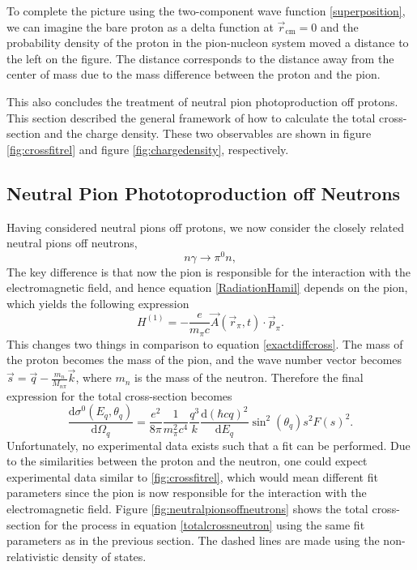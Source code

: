 To complete the picture using the two-component wave function \eqref{superposition}, we can imagine the bare proton as a delta function at $\vec{r}_\text{cm}=0$ and the probability density of the proton in the pion-nucleon system moved a distance to the left on the figure. The distance corresponds to the distance away from the center of mass due to the mass difference between the proton and the pion. 

This also concludes the treatment of neutral pion photoproduction off protons. This section described the general framework of how to calculate the total cross-section and the charge density. These two observables are shown in figure \ref{fig:crossfitrel} and figure \ref{fig:chargedensity}, respectively.


\subsection{Neutral Pion Phototoproduction off Neutrons}\label{sec:NoffN}
Having considered neutral pions off protons, we now consider the closely related neutral pions off neutrons,
\begin{equation} \label{process2}
	n\gamma \rightarrow \pi^0 n,
\end{equation}
The key difference is that now the pion is responsible for the interaction with the electromagnetic field, and hence equation \eqref{RadiationHamil} depends on the pion, which yields the following expression
\begin{equation} \label{RadiNeutron}
	H^{(1)} = -\frac{e}{m_\pi c}\vec{A}(\vec{r}_\pi,t)\cdot\vec{p}_\pi.
\end{equation}
This changes two things in comparison to equation \eqref{exactdiffcross}. The mass of the proton becomes the mass of the pion, and the wave number vector becomes $\vec{s}=\vec{q}-\frac{m_n}{M_{n\pi}}\vec{k}$, where $m_n$ is the mass of the neutron. Therefore the final expression for the total cross-section becomes 
\begin{equation} \label{totalcrossneutron}
	\frac{\text{d}\sigma^0(E_q,\theta_q)}{\text{d}\Omega_q} = \frac{e^2}{8\pi}\frac{1}{m_\pi^2c^4}\frac{q^3}{k}\frac{\text{d}(\hbar c q)^2}{\text{d}E_q}\sin^2(\theta_q) s^2 F(s)^2.
\end{equation}
Unfortunately, no experimental data exists such that a fit can be performed. Due to the similarities between the proton and the neutron, one could expect experimental data similar to \ref{fig:crossfitrel}, which would mean different fit parameters since the pion is now responsible for the interaction with the electromagnetic field. Figure \ref{fig:neutralpionsoffneutrons} shows the total cross-section for the process in equation \eqref{totalcrossneutron} using the same fit parameters as in the previous section. The dashed lines are made using the non-relativistic density of states.
